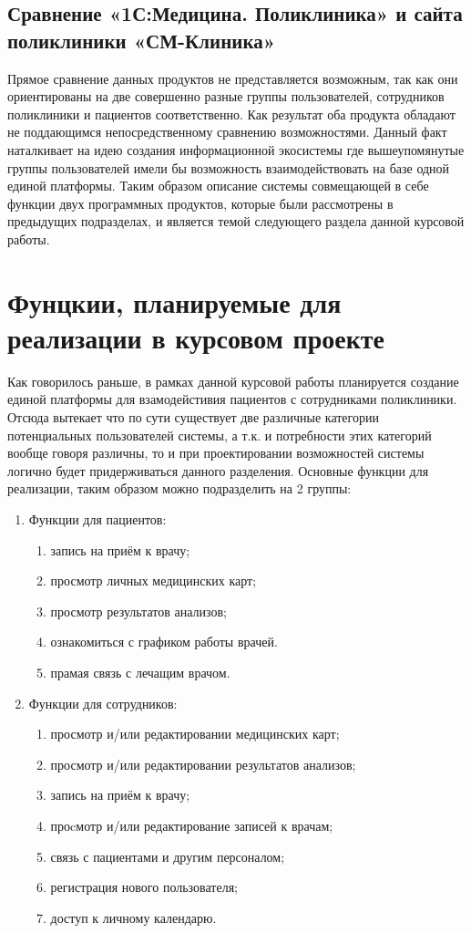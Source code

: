 \documentclass[14pt,a4paper,russian]{extreport}
\begin{document}
\subsection{Сравнение «1С:Медицина. Поликлиника» и сайта поликлиники «СМ-Клиника»}
Прямое сравнение данных продуктов не представляется возможным, так как они ориентированы на две
совершенно разные группы пользователей, сотрудников поликлиники и пациентов соответственно. Как
результат оба продукта обладают не поддающимся непосредственному сравнению возможностями. Данный факт
наталкивает на идею создания информационной экосистемы где вышеупомянутые группы пользователей
имели бы возможность взаимодействовать на базе одной единой платформы. Таким образом описание
системы совмещающей в себе функции двух программных продуктов, которые были рассмотрены в
предыдущих подразделах, и является темой следующего раздела данной курсовой работы.


\section{Фунцкии, планируемые для реализации в курсовом проекте}
Как говорилось раньше, в рамках данной курсовой работы планируется создание единой платформы для
взамодейстивия пациентов с сотрудниками поликлиники. Отсюда вытекает что по сути существует две
различные категории потенциальных пользователей системы, а т.к. и потребности этих категорий вообще
говоря различны, то и при проектировании возможностей системы логично будет придерживаться данного
разделения. Основные функции для реализации, таким образом можно подразделить на 2 группы: 
\begin{enumerate}[noitemsep]
    \item Функции для пациентов:
        \begin{enumerate}[noitemsep]
            \item запись на приём к врачу;
            \item просмотр личных медицинских карт;
            \item просмотр результатов анализов;
            \item ознакомиться с графиком работы врачей.
            \item прамая связь с лечащим врачом.
        \end{enumerate}
    \item Функции для сотрудников:
        \begin{enumerate}
            \item просмотр и/или редактировании медицинских карт;
            \item просмотр и/или редактировании результатов анализов;
            \item запись на приём к врачу;
            \item проcмотр и/или редактирование записей к врачам;
            \item связь с пациентами и другим персоналом;
            \item регистрация нового пользователя;
            \item доступ к личному календарю.
        \end{enumerate}
\end{enumerate}
\end{document}
